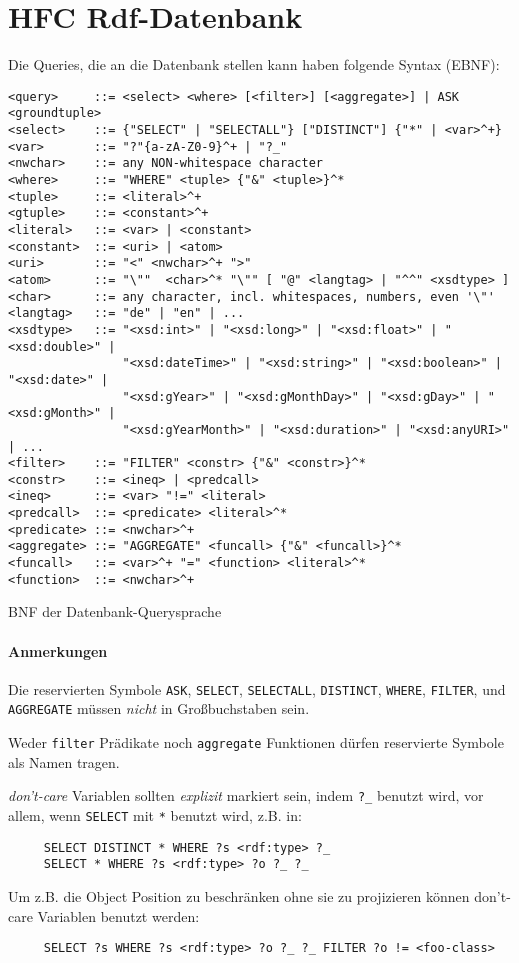\section{HFC Rdf-Datenbank}

Die Queries, die an die Datenbank stellen kann haben folgende Syntax (EBNF):
\begin{table}[htbp]
  \centering\small
\begin{verbatim}
<query>     ::= <select> <where> [<filter>] [<aggregate>] | ASK <groundtuple>
<select>    ::= {"SELECT" | "SELECTALL"} ["DISTINCT"] {"*" | <var>^+}
<var>       ::= "?"{a-zA-Z0-9}^+ | "?_"
<nwchar>    ::= any NON-whitespace character
<where>     ::= "WHERE" <tuple> {"&" <tuple>}^*
<tuple>     ::= <literal>^+
<gtuple>    ::= <constant>^+
<literal>   ::= <var> | <constant>
<constant>  ::= <uri> | <atom>
<uri>       ::= "<" <nwchar>^+ ">"
<atom>      ::= "\""  <char>^* "\"" [ "@" <langtag> | "^^" <xsdtype> ]
<char>      ::= any character, incl. whitespaces, numbers, even '\"'
<langtag>   ::= "de" | "en" | ...
<xsdtype>   ::= "<xsd:int>" | "<xsd:long>" | "<xsd:float>" | "<xsd:double>" |
                "<xsd:dateTime>" | "<xsd:string>" | "<xsd:boolean>" | "<xsd:date>" |
                "<xsd:gYear>" | "<xsd:gMonthDay>" | "<xsd:gDay>" | "<xsd:gMonth>" |
                "<xsd:gYearMonth>" | "<xsd:duration>" | "<xsd:anyURI>" | ...
<filter>    ::= "FILTER" <constr> {"&" <constr>}^*
<constr>    ::= <ineq> | <predcall>
<ineq>      ::= <var> "!=" <literal>
<predcall>  ::= <predicate> <literal>^*
<predicate> ::= <nwchar>^+
<aggregate> ::= "AGGREGATE" <funcall> {"&" <funcall>}^*
<funcall>   ::= <var>^+ "=" <function> <literal>^*
<function>  ::= <nwchar>^+
\end{verbatim}
  \caption{BNF der Datenbank-Querysprache}
  \label{tab:hfcquerybnf}
\end{table}

\paragraph{Anmerkungen}

Die reservierten Symbole \texttt{ASK}, \texttt{SELECT}, \texttt{SELECTALL},
\texttt{DISTINCT}, \texttt{WHERE}, \texttt{FILTER}, und \texttt{AGGREGATE}
müssen \emph{nicht} in Großbuchstaben sein.

Weder \texttt{filter} Prädikate noch \texttt{aggregate} Funktionen dürfen
reservierte Symbole als Namen tragen.

\emph{don't-care} Variablen sollten \emph{explizit} markiert sein, indem
\verb|?_| benutzt wird, vor allem, wenn \texttt{SELECT} mit \verb|*| benutzt
wird, z.B. in:
\begin{verbatim}
     SELECT DISTINCT * WHERE ?s <rdf:type> ?_
     SELECT * WHERE ?s <rdf:type> ?o ?_ ?_
\end{verbatim}
Um z.B. die Object Position zu beschränken ohne sie zu projizieren können
don't-care Variablen benutzt werden:
\begin{verbatim}
     SELECT ?s WHERE ?s <rdf:type> ?o ?_ ?_ FILTER ?o != <foo-class>
\end{verbatim}

